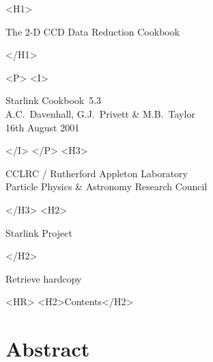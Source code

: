 \documentclass[twoside,11pt]{article}
\newcommand{\stardoccategory}  {Starlink Cookbook}
\newcommand{\stardocsource}    {sc\stardocnumber}
\newcommand{\stardocnumber}    {5.3}
\newcommand{\stardocauthors}   {A.C.~Davenhall, G.J.~Privett \& M.B.~Taylor}
\newcommand{\stardocdate}      {16th August 2001}
\newcommand{\stardoctitle}     {The 2-D CCD Data Reduction Cookbook}
\newcommand{\htmladdnormallink}[2]{#1}
\newcommand{\htmladdimg}[1]{}
\newcommand{\htmlref}[2]{#1}
\newcommand{\htmladdtonavigation}[1]{}
\newcommand{\xlabel}[1]{}
\begin{document}
\begin{htmlonly}
   \xlabel{}
   \begin{rawhtml} <H1> \end{rawhtml}
      \stardoctitle
   \begin{rawhtml} </H1> \end{rawhtml}


   \begin{rawhtml} <P> <I> \end{rawhtml}
   \stardoccategory\ \stardocnumber \\
   \stardocauthors \\
   \stardocdate
   \begin{rawhtml} </I> </P> <H3> \end{rawhtml}
      \htmladdnormallink{CCLRC}{http://www.cclrc.ac.uk} /
      \htmladdnormallink{Rutherford Appleton Laboratory}
                        {http://www.cclrc.ac.uk/ral} \\
      \htmladdnormallink{Particle Physics \& Astronomy Research Council}
                        {http://www.pparc.ac.uk} \\
   \begin{rawhtml} </H3> <H2> \end{rawhtml}
      \htmladdnormallink{Starlink Project}{http://www.starlink.ac.uk/}
   \begin{rawhtml} </H2> \end{rawhtml}
   \htmladdnormallink{\htmladdimg{source.gif} Retrieve hardcopy}
      {http://www.starlink.ac.uk/cgi-bin/hcserver?\stardocsource}\\

  \label{stardoccontents}
  \begin{rawhtml}
    <HR>
    <H2>Contents</H2>
  \end{rawhtml}
  \htmladdtonavigation{\htmlref{\htmladdimg{contents_motif.gif}}
        {stardoccontents}}

  \section{\xlabel{abstract}Abstract}
\end{htmlonly}
\end{document}
